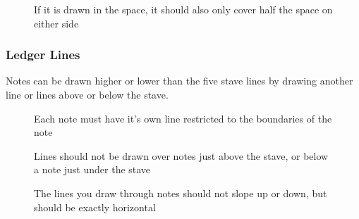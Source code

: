\begin{figure}[h!]
  \centering
  \caption{If it is drawn in the space, it should also only cover half the space on either side}
  \label{fig:SemibreveOnSpace}
\end{figure}

\subsubsection*{Ledger Lines}

Notes can be drawn higher or lower than the five stave lines by drawing another line or lines above or below the stave.

\begin{figure}[h!]
  \centering
  \caption{Each note must have it's own line restricted to the boundaries of the note}
  \label{fig:LedgerBoundaries}
\end{figure}


\begin{figure}[h!]
  \centering
  \caption{Lines should not be drawn over notes just above the stave, or below a note just under the stave}
  \label{fig:LedgerAbove}
\end{figure}


\begin{figure}[h!]
  \centering
  \caption{The lines you draw through notes should not slope up or down, but should be exactly horizontal}
  \label{fig:LedgerSlope}
\end{figure}

